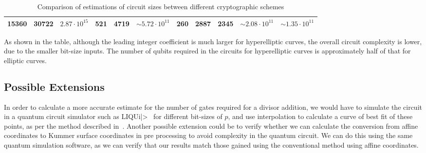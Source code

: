 \begin{table}[!htb]
{\begin{tabular}{|c|c|c|c|c|c|c|c|c|c|c|}
15360                                                       & 30722  & $2.87\cdot10^{15}$ & 521                                                         & 4719   & $\sim5.72\cdot10^{11}$ & 260                                                         & 2887                                                       & 2345                                                       & $\sim2.08\cdot10^{11}$                                            & $\sim1.35\cdot10^{11}$                                            \\ \hline
\end{tabular}}
\caption{Comparison of estimations of circuit sizes between different cryptographic schemes}
\label{table:circuitSizeComparison}
\end{table}
As shown in the table, although the leading integer coefficient is much larger for hyperelliptic curves, the overall circuit complexity is lower, due to the smaller bit-size inputs. The number of qubits required in the circuits for hyperelliptic curves is approximately half of that for elliptic curves.
\subsection{Possible Extensions}
In order to calculate a more accurate estimate for the number of gates required for a divisor addition, we would have to simulate the circuit in a quantum circuit simulator such as {LIQU}i|>~\cite{1402.4467} for different bit-sizes of $p$, and use interpolation to calculate a curve of best fit of these points, as per the method described in~\cite{roetteler2017quantum}.
Another possible extension could be to verify whether we can calculate the conversion from affine coordinates to Kummer surface coordinates in pre processing to avoid complexity in the quantum circuit. We can do this using the same quantum simulation software, as we can verify that our results match those gained using the conventional method using affine coordinates.